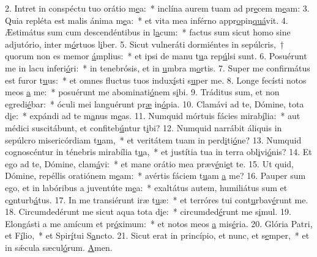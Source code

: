 2. Intret in conspéctu tuo orátio m\uline{e}a:~* inclína aurem tuam ad pr\uline{e}cem m\uline{e}am:
3. Quia repléta est malis ánima m\uline{e}a:~* et vita mea inférno appr\uline{o}pin\uline{quá}vit.
4. Æstimátus sum cum descendéntibus in l\uline{a}cum:~* factus sum sicut homo sine adjutório, inter m\uline{ó}rtuos l\uline{i}ber.
5. Sicut vulneráti dormiéntes in sepúlcris,~† quorum non es memor \uline{á}mplius:~* et ipsi de manu t\uline{u}a rep\uline{ú}lsi sunt.
6. Posuérunt me in lacu inferi\uline{ó}ri:~* in tenebrósis, et in \uline{u}mbra m\uline{o}rtis.
7. Super me confirmátus est furor t\uline{u}us:~* et omnes fluctus tuos indux\uline{í}sti s\uline{u}per me.
8. Longe fecísti notos meos \uline{a} me:~* posuérunt me abominati\uline{ó}nem s\uline{i}bi.
9. Tráditus sum, et non egredi\uline{é}bar:~* óculi mei languérunt pr\uline{æ} in\uline{ó}pia.
10. Clamávi ad te, Dómine, tota d\uline{i}e:~* expándi ad te m\uline{a}nus m\uline{e}as.
11. Numquid mórtuis fácies mirab\uline{í}lia:~* aut médici suscitábunt, et confiteb\uline{ú}ntur t\uline{i}bi?
12. Numquid narrábit áliquis in sepúlcro misericórdiam t\uline{u}am,~* et veritátem tuam in perd\uline{i}ti\uline{ó}ne?
13. Numquid cognoscéntur in ténebris mirabília t\uline{u}a,~* et justítia tua in terra obl\uline{i}vi\uline{ó}nis?
14. Et ego ad te, Dómine, clam\uline{á}vi:~* et mane orátio mea præv\uline{é}ni\uline{e}t te.
15. Ut quid, Dómine, repéllis oratiónem m\uline{e}am:~* avértis fáciem t\uline{u}am \uline{a} me?
16. Pauper sum ego, et in labóribus a juventúte m\uline{e}a:~* exaltátus autem, humiliátus sum et c\uline{o}nturb\uline{á}tus.
17. In me transiérunt iræ t\uline{u}æ:~* et terróres tui cont\uline{u}rbav\uline{é}runt me.
18. Circumdedérunt me sicut aqua tota d\uline{i}e:~* circumded\uline{é}runt me s\uline{i}mul.
19. Elongásti a me amícum et pr\uline{ó}ximum:~* et notos meos \uline{a} mis\uline{é}ria.
20. Glória Patri, et F\uline{í}lio,~* et Spir\uline{í}tui S\uline{a}ncto.
21. Sicut erat in princípio, et nunc, et s\uline{e}mper,~* et in sǽcula sæcul\uline{ó}rum. \uline{A}men.
